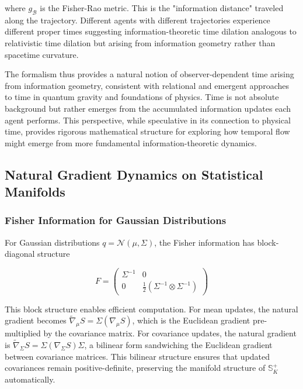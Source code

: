 \documentclass[11pt]{article}
\begin{document}
where $g_{\mathcal{B}}$ is the Fisher-Rao metric. This is the "information distance" traveled along the trajectory. Different agents with different trajectories experience different proper times suggesting information-theoretic time dilation analogous to relativistic time dilation but arising from information geometry rather than spacetime curvature.

The formalism thus provides a natural notion of observer-dependent time arising from information geometry, consistent with relational and emergent approaches to time in quantum gravity and foundations of physics. Time is not absolute background but rather emerges from the accumulated information updates each agent performs. This perspective, while speculative in its connection to physical time, provides rigorous mathematical structure for exploring how temporal flow might emerge from more fundamental information-theoretic dynamics.\subsection{Natural Gradient Dynamics on Statistical Manifolds}



\subsubsection{Fisher Information for Gaussian Distributions}

For Gaussian distributions $q = \mathcal{N}(\mu, \Sigma)$, the Fisher information has block-diagonal structure

\begin{equation}
F = \begin{pmatrix} 
\Sigma^{-1} & 0 \\ 
0 & \frac{1}{2}(\Sigma^{-1} \otimes \Sigma^{-1})
\end{pmatrix}
\end{equation}

This block structure enables efficient computation. For mean updates, the natural gradient becomes $\tilde{\nabla}_\mu S = \Sigma (\nabla_\mu S)$, which is the Euclidean gradient pre-multiplied by the covariance matrix. For covariance updates, the natural gradient is $\tilde{\nabla}_\Sigma S = \Sigma (\nabla_\Sigma S) \Sigma$, a bilinear form sandwiching the Euclidean gradient between covariance matrices. This bilinear structure ensures that updated covariances remain positive-definite, preserving the manifold structure of $\mathbb{S}^+_K$ automatically.
\end{document}
